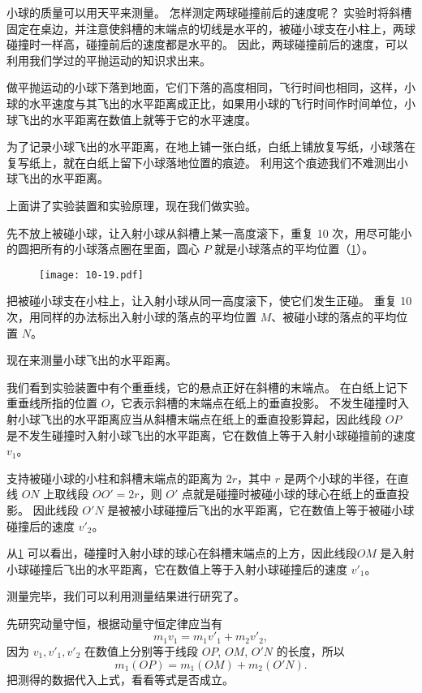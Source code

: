 小球的质量可以用天平来测量。
怎样测定两球碰撞前后的速度呢？
实验时将斜槽固定在桌边，并注意使斜槽的末端点的切线是水平的，被碰小球支在小柱上，两球碰撞时一样高，碰撞前后的速度都是水平的。
因此，两球碰撞前后的速度，可以利用我们学过的平抛运动的知识求出来。

做平抛运动的小球下落到地面，它们下落的高度相同，飞行时间也相同，这样，小球的水平速度与其飞出的水平距离成正比，如果用小球的飞行时间作时间单位，小球飞出的水平距离在数值上就等于它的水平速度。

为了记录小球飞出的水平距离，在地上铺一张白纸，白纸上铺放复写纸，小球落在复写纸上，就在白纸上留下小球落地位置的痕迹。
利用这个痕迹我们不难测出小球飞出的水平距离。

上面讲了实验装置和实验原理，现在我们做实验。

先不放上被碰小球，让入射小球从斜槽上某一高度滚下，重复 10 次，用尽可能小的圆把所有的小球落点圈在里面，圆心 $P$ 就是小球落点的平均位置（\cref{fig:10-19}）。
\begin{figure}
  \texttt{[image: 10-19.pdf]}
  \caption{}\label{fig:10-19}
\end{figure}

把被碰小球支在小柱上，让入射小球从同一高度滚下，使它们发生正碰。
重复 10 次，用同样的办法标出入射小球的落点的平均位置 $M$、被碰小球的落点的平均位置 $N$。

现在来测量小球飞出的水平距离。

我们看到实验装置中有个重垂线，它的悬点正好在斜槽的末端点。
在白纸上记下重垂线所指的位置 $O$，它表示斜槽的末端点在纸上的垂直投影。
不发生碰撞时入射小球飞出的水平距离应当从斜槽末端点在纸上的垂直投影算起，因此线段 $OP$ 是不发生碰撞时入射小球飞出的水平距离，它在数值上等于入射小球碰擅前的速度 $v_1$。

支持被碰小球的小柱和斜槽末端点的距离为 $2r$，其中 $r$ 是两个小球的半径，在直线 $ON$ 上取线段 $OO'=2r$，则 $O'$ 点就是碰撞时被碰小球的球心在纸上的垂直投影。
因此线段 $O'N$ 是被被小球碰撞后飞出的水平距离，它在数值上等于被碰小球碰撞后的速度 $v'_2$。

从\cref{fig:10-19} 可以看出，碰撞时入射小球的球心在斜槽末端点的上方，因此线段$OM$ 是入射小球碰撞后飞出的水平距离，它在数值上等于入射小球碰撞后的速度 $v'_1$。

测量完毕，我们可以利用测量结果进行研究了。

先研究动量守恒，根据动量守恒定律应当有
\[m_1v_1=m_1v'_1+m_2v'_2,\]
因为 $v_1, v'_1,v'_2$ 在数值上分别等于线段 $OP$, $OM$, $O'N$ 的长度，所以
\[m_1(OP)=m_1(OM)+m_2(O'N).\]
把测得的数据代入上式，看看等式是否成立。

